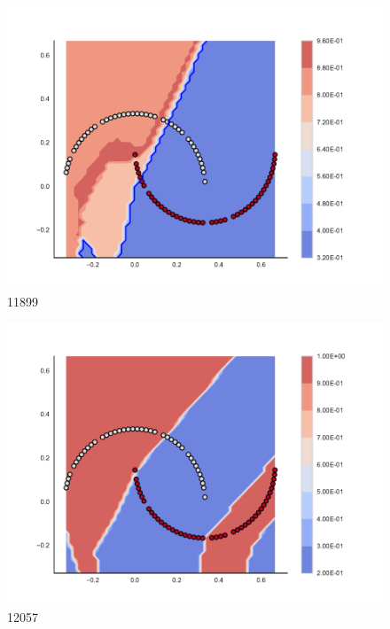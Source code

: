 \begin{subfigure}[b]{0.09\textwidth}
    \includegraphics[width=\textwidth]{img/convergence/11899.pdf}
    \caption{11899}
    \label{fig:convergence_11899}
\end{subfigure}
%
\begin{subfigure}[b]{0.09\textwidth}
    \includegraphics[width=\textwidth]{img/convergence/12057.pdf}
    \caption{12057}
    \label{fig:convergence_12057}
\end{subfigure}
%
